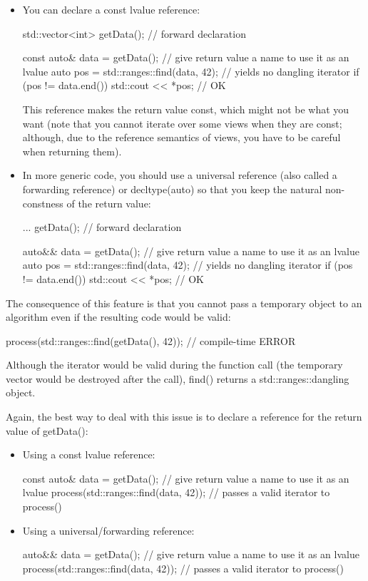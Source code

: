 \begin{itemize}
\item
You can declare a const lvalue reference:

\begin{cpp}
std::vector<int> getData(); // forward declaration

const auto& data = getData(); // give return value a name to use it as an lvalue
auto pos = std::ranges::find(data, 42); // yields no dangling iterator
if (pos != data.end()) {
	std::cout << *pos; // OK
}
\end{cpp}

This reference makes the return value const, which might not be what you want (note that you cannot iterate over some views when they are const; although, due to the reference semantics of views, you have to be careful when returning them).

\item
In more generic code, you should use a universal reference (also called a forwarding reference) or decltype(auto) so that you keep the natural non-constness of the return value:

\begin{cpp}
... getData(); // forward declaration

auto&& data = getData(); // give return value a name to use it as an lvalue
auto pos = std::ranges::find(data, 42); // yields no dangling iterator
if (pos != data.end()) {
	std::cout << *pos; // OK
}
\end{cpp}
\end{itemize}

The consequence of this feature is that you cannot pass a temporary object to an algorithm even if the resulting code would be valid:

\begin{cpp}
process(std::ranges::find(getData(), 42)); // compile-time ERROR
\end{cpp}

Although the iterator would be valid during the function call (the temporary vector would be destroyed after the call), find() returns a std::ranges::dangling object.

Again, the best way to deal with this issue is to declare a reference for the return value of getData():

\begin{itemize}
\item
Using a const lvalue reference:

\begin{cpp}
const auto& data = getData(); // give return value a name to use it as an lvalue
process(std::ranges::find(data, 42)); // passes a valid iterator to process()
\end{cpp}

\item
Using a universal/forwarding reference:

\begin{cpp}
auto&& data = getData(); // give return value a name to use it as an lvalue
process(std::ranges::find(data, 42)); // passes a valid iterator to process()
\end{cpp}
\end{itemize}

